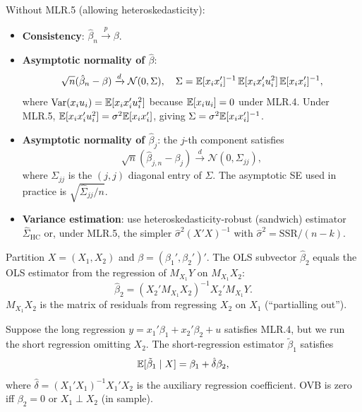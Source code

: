 \begin{remark}
	Without MLR.5 (allowing heteroskedasticity):
	\begin{itemize}
		\item \textbf{Consistency}: $\hat\beta_n\xrightarrow{p}\beta$.
		\item \textbf{Asymptotic normality of $\hat\beta$}:
		      \[
		      	\sqrt{n}(\hat\beta_n-\beta)\xrightarrow{d}\mathcal{N}(0,\Sigma),\quad
		      	\Sigma=\mathbb{E}[x_ix_i']^{-1}\,\mathbb{E}[x_ix_i'u_i^2]\,\mathbb{E}[x_ix_i']^{-1},
		      \]
		      where $\operatorname{Var}(x_iu_i)=\mathbb{E}[x_ix_i'u_i^2]$ because $\mathbb{E}[x_iu_i]=0$ under MLR.4. Under MLR.5, $\mathbb{E}[x_ix_i'u_i^2]=\sigma^2\mathbb{E}[x_ix_i']$, giving $\Sigma=\sigma^2\mathbb{E}[x_ix_i']^{-1}$.
		\item \textbf{Asymptotic normality of $\hat\beta_j$}: the $j$-th component satisfies
		      \[
		      	\sqrt{n}(\hat\beta_{j,n}-\beta_j)\xrightarrow{d}\mathcal{N}(0,\Sigma_{jj}),
		      \]
		      where $\Sigma_{jj}$ is the $(j,j)$ diagonal entry of $\Sigma$. The asymptotic SE used in practice is $\sqrt{\hat\Sigma_{jj}/n}$.
		\item \textbf{Variance estimation}: use heteroskedasticity-robust (sandwich) estimator $\hat\Sigma_{\mathrm{HC}}$ or, under MLR.5, the simpler $\hat\sigma^2(X'X)^{-1}$ with $\hat\sigma^2=\text{SSR}/(n-k)$.
	\end{itemize}
\end{remark}

\begin{remark}
	Partition $X=(X_1,X_2)$ and $\beta=(\beta_1',\beta_2')'$. The OLS subvector $\hat\beta_2$ equals the OLS estimator from the regression of $M_{X_1}Y$ on $M_{X_1}X_2$:
	\[
		\hat\beta_2=(X_2'M_{X_1}X_2)^{-1}X_2'M_{X_1}Y.
	\]
	$M_{X_1}X_2$ is the matrix of residuals from regressing $X_2$ on $X_1$ (``partialling out'').
\end{remark}

\begin{remark}
	Suppose the long regression $y=x_1'\beta_1+x_2'\beta_2+u$ satisfies MLR.4, but we run the short regression omitting $X_2$. The short-regression estimator $\tilde\beta_1$ satisfies
	\[
		\mathbb{E}[\tilde\beta_1\mid X]=\beta_1+\hat\delta\beta_2,
	\]
	where $\hat\delta=(X_1'X_1)^{-1}X_1'X_2$ is the auxiliary regression coefficient. OVB is zero iff $\beta_2=0$ or $X_1\perp X_2$ (in sample).
\end{remark}


